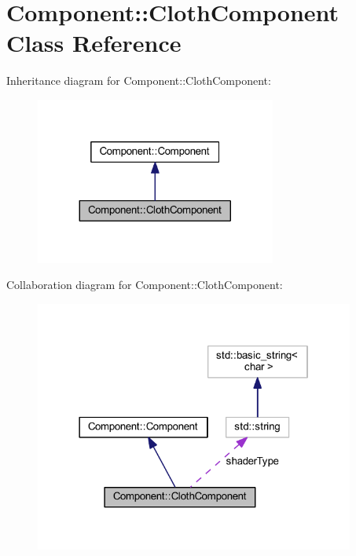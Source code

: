 \hypertarget{class_component_1_1_cloth_component}{}\section{Component\+:\+:Cloth\+Component Class Reference}
\label{class_component_1_1_cloth_component}


Inheritance diagram for Component\+:\+:Cloth\+Component\+:
\nopagebreak
\begin{figure}[H]
\begin{center}
\leavevmode
\includegraphics[width=224pt]{class_component_1_1_cloth_component__inherit__graph}
\end{center}
\end{figure}


Collaboration diagram for Component\+:\+:Cloth\+Component\+:
\nopagebreak
\begin{figure}[H]
\begin{center}
\leavevmode
\includegraphics[width=298pt]{class_component_1_1_cloth_component__coll__graph}
\end{center}
\end{figure}
